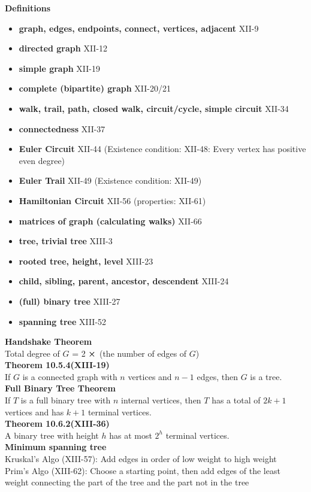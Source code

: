 \documentclass[a4paper]{article}
\newcommand{\subheading}[1]{{\scriptsize\textbf{#1}}}
\begin{document}
\begin{multicols*}{4}
\subheading{Definitions}
\begin{itemize}
	\item \textbf{graph, edges, endpoints, connect, vertices, adjacent} XII-9
	\item \textbf{directed graph} XII-12
	\item \textbf{simple graph} XII-19
	\item \textbf{complete (bipartite) graph} XII-20/21
	\item \textbf{walk, trail, path, closed walk, circuit/cycle, simple circuit} XII-34
	\item \textbf{connectedness} XII-37
	\item \textbf{Euler Circuit} XII-44 (Existence condition: XII-48: Every vertex has positive even degree)
	\item \textbf{Euler Trail} XII-49 (Existence condition: XII-49)
	\item \textbf{Hamiltonian Circuit} XII-56 (properties: XII-61)
	\item \textbf{matrices of graph (calculating walks)} XII-66~
	\item \textbf{tree, trivial tree} XIII-3
	\item \textbf{rooted tree, height, level} XIII-23
	\item \textbf{child, sibling, parent, ancestor, descendent} XIII-24
	\item \textbf{(full) binary tree} XIII-27
	\item \textbf{spanning tree} XIII-52
\end{itemize}

\subheading{Handshake Theorem}\\
Total degree of $G$ = 2 $\cross$ (the number of edges of $G$)\\

\subheading{Theorem 10.5.4(XIII-19)}\\
If $G$ is a connected graph with $n$ vertices and $n-1$ edges, then $G$ is a tree.\\

\subheading{Full Binary Tree Theorem}\\
If $T$ is a full binary tree with $n$ internal vertices, then $T$ has a total of $2k+1$ vertices and has $k+1$ terminal vertices.\\

\subheading{Theorem 10.6.2(XIII-36)}\\
A binary tree with height $h$ has at most $2^h$ terminal vertices.\\

\subheading{Minimum spanning tree}\\
Kruskal's Algo (XIII-57): Add edges in order of low weight to high weight\\

Prim's Algo (XIII-62): Choose a starting point, then add edges of the least weight connecting the part of the tree and the part not in the tree 
\end{multicols*}
\end{document}
